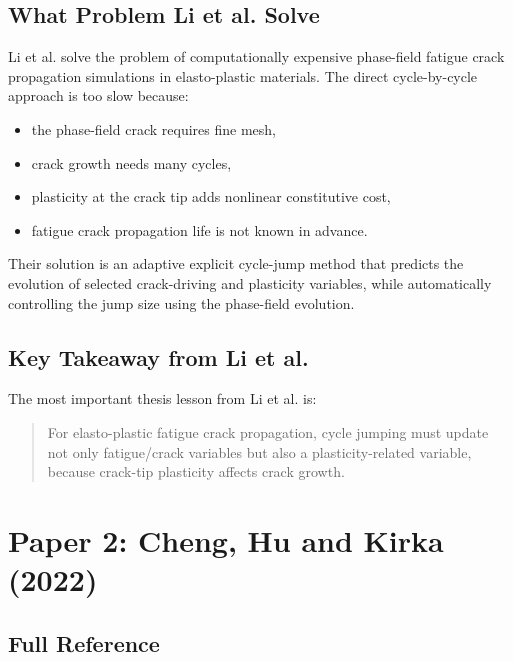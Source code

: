 \documentclass[11pt,a4paper]{article}
\begin{document}
\subsection{What Problem Li et al. Solve}

Li et al. solve the problem of computationally expensive phase-field fatigue crack propagation simulations in elasto-plastic materials. The direct cycle-by-cycle approach is too slow because:

\begin{itemize}
    \item the phase-field crack requires fine mesh,
    \item crack growth needs many cycles,
    \item plasticity at the crack tip adds nonlinear constitutive cost,
    \item fatigue crack propagation life is not known in advance.
\end{itemize}

Their solution is an adaptive explicit cycle-jump method that predicts the evolution of selected crack-driving and plasticity variables, while automatically controlling the jump size using the phase-field evolution.

\subsection{Key Takeaway from Li et al.}

The most important thesis lesson from Li et al. is:

\begin{quote}
For elasto-plastic fatigue crack propagation, cycle jumping must update not only fatigue/crack variables but also a plasticity-related variable, because crack-tip plasticity affects crack growth.
\end{quote}

\newpage
\section{Paper 2: Cheng, Hu and Kirka (2022)}

\subsection{Full Reference}
\end{document}
